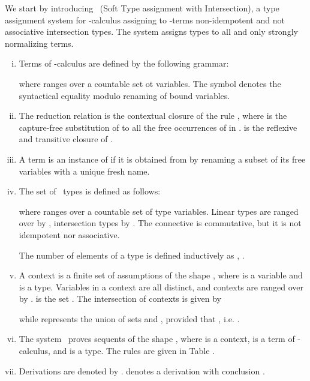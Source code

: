 We start by introducing \STI\ (Soft Type assignment with Intersection), a type assignment system for -calculus assigning to -terms non-idempotent and not associative intersection types. The system assigns types to all and only strongly normalizing terms.

\begin{definition}
\begin{enumerate}[i)]
\item Terms of -calculus are defined by the following grammar:

where  ranges over a countable set ot variables. The symbol  denotes the syntactical equality modulo renaming of bound variables.
\item The reduction relation  is the contextual closure of the rule ,
where  is the capture-free substitution of  to all the free occurrences of  in .   is the reflexive and transitive closure of .

\item A term  is an instance of  if it is obtained from  by renaming a subset of its free variables with a unique fresh name.

\item The set of \STI\ types is defined as follows:

where  ranges over a countable set of type variables. Linear types are ranged over by , intersection types by 
.  The connective  is commutative, but it is not idempotent nor associative.

The number of elements of a type is defined inductively as , .

\item A context is a finite set of assumptions of the shape , where  is a variable and  is a type. Variables in a context are all distinct, and
contexts are ranged over by .  is the set .
The intersection of contexts is given by

while  represents the union of sets  and , provided that , i.e. .

\item The system \STI\ proves sequents of the shape ,
where  is a context,  is a term of -calculus, and  is a type. The rules are given in Table .

\item Derivations are denoted by .  denotes a derivation  with conclusion 
.

\end{enumerate}
\end{definition}

